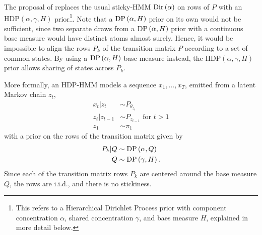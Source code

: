 The proposal of \citep{teh2006hierarchical} replaces the usual sticky-HMM
$\textnormal{Dir}\left(\alpha\right)$ on rows of $P$ with an $\text{HDP}\left(\alpha,
\gamma, H\right)$ prior\footnote{This refers to a Hierarchical Dirichlet Process
  prior with component concentration $\alpha$, shared concentration $\gamma$,
  and baes measure $H$, explained in more detail below.}. Note that a
$\textnormal{DP}\left(\alpha, H\right)$ prior on its own would not be sufficient, since two
separate draws from a $\textnormal{DP}\left(\alpha, H\right)$ prior with a continuous base
measure would have distinct atoms almost surely. Hence, it would be impossible
to align the rows $P_{k}$ of the transition matrix $P$ according to a set of
common states. By using a $\textnormal{DP}\left(\alpha, H\right)$ base measure instead, the
$\text{HDP}\left(\alpha, \gamma, H\right)$ prior allows sharing of states across
$P_{k}$.

More formally, an HDP-HMM models a sequence $x_{1}, \dots, x_{T}$, emitted from
a latent Markov chain $z_t$,
\begin{align*}
  x_t \vert z_t &\sim P_{\theta_{z_t}} \\
  z_t \vert z_{t - 1} &\sim P_{z_{t - 1}} \text{ for } t > 1 \\
  z_1 &\sim \pi_1
\end{align*}
with a prior on the rows of the transition matrix given by
\begin{align*}
  P_k \vert Q &\sim \textnormal{DP}\left(\alpha, Q\right) \\
  Q &\sim \textnormal{DP}\left(\gamma, H\right).
\end{align*}
Since each of the transition matrix rows $P_k$ are centered around the base
measure $Q$, the rows are i.i.d., and there is no stickiness.

